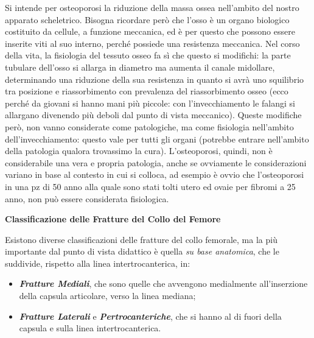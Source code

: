 \documentclass[]{article}
\begin{document}
Si intende per osteoporosi la riduzione della massa ossea nell'ambito
del nostro apparato scheletrico. Bisogna ricordare però che l'osso è un
organo biologico costituito da cellule, a funzione meccanica, ed è per
questo che possono essere inserite viti al suo interno, perché possiede
una resistenza meccanica. Nel corso della vita, la fisiologia del
tessuto osseo fa sì che questo si modifichi: la parte tubulare dell'osso
si allarga in diametro ma aumenta il canale midollare, determinando una
riduzione della sua resistenza in quanto si avrà uno squilibrio tra
posizione e riassorbimento con prevalenza del riassorbimento osseo (ecco
perché da giovani si hanno mani più piccole: con l'invecchiamento le
falangi si allargano divenendo più deboli dal punto di vista meccanico).
Queste modifiche però, non vanno considerate come patologiche, ma come
fisiologia nell'ambito dell'invecchiamento: questo vale per tutti gli
organi (potrebbe entrare nell'ambito della patologia qualora trovassimo
la cura). L'osteoporosi, quindi, non è considerabile una vera e propria
patologia, anche se ovviamente le considerazioni variano in base al
contesto in cui si colloca, ad esempio è ovvio che l'osteoporosi in una
pz di 50 anno alla quale sono stati tolti utero ed ovaie per fibromi a
25 anno, non può essere considerata fisiologica.

\textbf{Classificazione delle Fratture del Collo del Femore }

Esistono diverse classificazioni delle fratture del collo femorale, ma
la più importante dal punto di vista didattico è quella \emph{su base
anatomica}, che le suddivide, rispetto alla linea intertrocanterica, in:

\begin{itemize}
\item
  \textbf{\emph{Fratture Mediali}}, che sono quelle che avvengono
  medialmente all'inserzione della capsula articolare, verso la linea
  mediana;
\item
  \textbf{\emph{Fratture Laterali}} e \textbf{\emph{Pertrocanteriche}},
  che si hanno al di fuori della capsula e sulla linea
  intertrocanterica.
\end{itemize}
\end{document}
